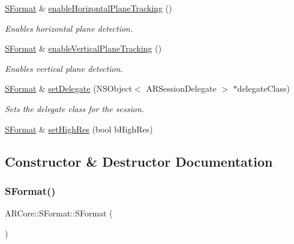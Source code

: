 \begin{DoxyCompactItemize}
\mbox{\hyperlink{class_a_r_core_1_1_s_format}{S\+Format}} \& \mbox{\hyperlink{class_a_r_core_1_1_s_format_a3e84a3a07404e993efa7dbf2bb2aa484}{enable\+Horizontal\+Plane\+Tracking}} ()
\begin{DoxyCompactList}\small\item\em Enables horizontal plane detection. \end{DoxyCompactList}\item 
\mbox{\hyperlink{class_a_r_core_1_1_s_format}{S\+Format}} \& \mbox{\hyperlink{class_a_r_core_1_1_s_format_a50041dc949c7e00b5febb8c8f102f386}{enable\+Vertical\+Plane\+Tracking}} ()
\begin{DoxyCompactList}\small\item\em Enables vertical plane detection. \end{DoxyCompactList}\item 
\mbox{\hyperlink{class_a_r_core_1_1_s_format}{S\+Format}} \& \mbox{\hyperlink{class_a_r_core_1_1_s_format_a944fac3b51c5193dcb306bd482f4f1f1}{set\+Delegate}} (N\+S\+Object$<$ A\+R\+Session\+Delegate $>$ $\ast$delegate\+Class)
\begin{DoxyCompactList}\small\item\em Sets the delegate class for the session. \end{DoxyCompactList}\item 
\mbox{\hyperlink{class_a_r_core_1_1_s_format}{S\+Format}} \& \mbox{\hyperlink{class_a_r_core_1_1_s_format_ab8ae6c580251e595bcd1304b4c858ab1}{set\+High\+Res}} (bool b\+High\+Res)
\end{DoxyCompactItemize}


\subsection{Constructor \& Destructor Documentation}
\mbox{\label{class_a_r_core_1_1_s_format_ae73326e3801cb8a94ef235acf1b6ea0a}} 
\subsubsection{\texorpdfstring{S\+Format()}{SFormat()}}
{\footnotesize\ttfamily A\+R\+Core\+::\+S\+Format\+::\+S\+Format (\begin{DoxyParamCaption}{ }\end{DoxyParamCaption})\hspace{0.3cm}{\ttfamily [inline]}}



